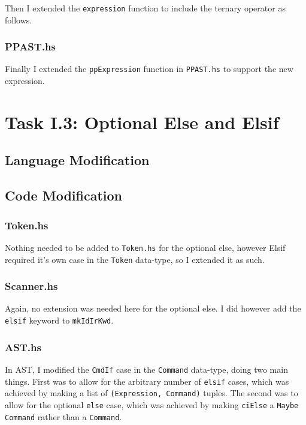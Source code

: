 \documentclass[12pt]{article}
\newcommand{\lstin}[3]{%
  
}
\begin{document}
\lstin{74}{74}{Parser.y}
\lstin{99}{99}{Parser.y}

Then I extended the \verb|expression| function to include the ternary operator as follows.

\lstin{185}{189}{Parser.y}

\subsubsection{PPAST.hs}
Finally I extended the \verb|ppExpression| function in \verb|PPAST.hs| to support the new expression.

\lstin{96}{100}{PPAST.hs}

\section{Task I.3: Optional Else and Elsif}
\subsection{Language Modification}

\subsection{Code Modification}
\subsubsection{Token.hs}
Nothing needed to be added to \verb|Token.hs| for the optional else, however Elsif required it's own case in the \verb|Token| data-type, so I extended it as such.

\lstin{49}{49}{Token.hs}

\subsubsection{Scanner.hs}
Again, no extension was needed here for the optional else. 
I did however add the \verb|elsif| keyword to \verb|mkIdIrKwd|.

\lstin{155}{155}{Scanner.hs}

\subsubsection{AST.hs}
In AST, I modified the \verb|CmdIf| case in the \verb|Command| data-type, doing two main things. 
First was to allow for the arbitrary number of \verb|elsif| cases, which was achieved by making a list of \verb|(Expression, Command)| tuples. 
The second was to allow for the optional \verb|else| case, which was achieved by making \verb|ciElse| a \verb|Maybe Command| rather than a \verb|Command|.
\end{document}
